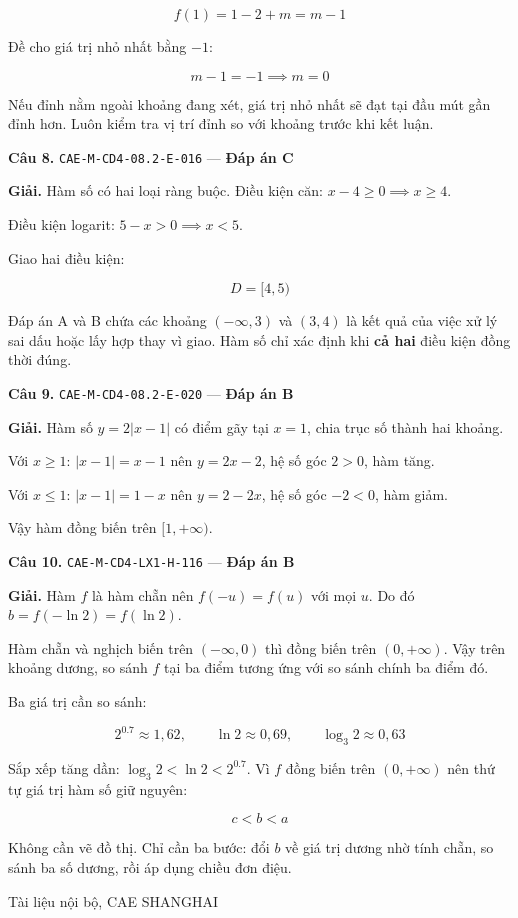 \documentclass[11pt, a4paper]{article}
\begin{document}
$$f(1) = 1 - 2 + m = m - 1$$

Đề cho giá trị nhỏ nhất bằng $-1$:

$$m - 1 = -1 \implies m = 0$$

 Nếu đỉnh nằm ngoài khoảng đang xét, giá trị nhỏ nhất sẽ đạt tại đầu mút gần đỉnh hơn. Luôn kiểm tra vị trí đỉnh so với khoảng trước khi kết luận.

\textbf{Câu 8.} \texttt{CAE-M-CD4-08.2-E-016} — \textbf{Đáp án C}

\textbf{Giải.} Hàm số có hai loại ràng buộc. Điều kiện căn: $x - 4 \ge 0 \implies x \ge 4$.

Điều kiện logarit: $5 - x > 0 \implies x < 5$.

Giao hai điều kiện:

$$D = [4, 5)$$

 Đáp án A và B chứa các khoảng $(-\infty, 3)$ và $(3, 4)$ là kết quả của việc xử lý sai dấu hoặc lấy hợp thay vì giao. Hàm số chỉ xác định khi \textbf{cả hai} điều kiện đồng thời đúng.

\textbf{Câu 9.} \texttt{CAE-M-CD4-08.2-E-020} — \textbf{Đáp án B}

\textbf{Giải.} Hàm số $y = 2|x - 1|$ có điểm gãy tại $x = 1$, chia trục số thành hai khoảng.

Với $x \ge 1$: $|x - 1| = x - 1$ nên $y = 2x - 2$, hệ số góc $2 > 0$, hàm tăng.

Với $x \le 1$: $|x - 1| = 1 - x$ nên $y = 2 - 2x$, hệ số góc $-2 < 0$, hàm giảm.

Vậy hàm đồng biến trên $[1, +\infty)$.

\textbf{Câu 10.} \texttt{CAE-M-CD4-LX1-H-116} — \textbf{Đáp án B}

\textbf{Giải.} Hàm $f$ là hàm chẵn nên $f(-u) = f(u)$ với mọi $u$. Do đó $b = f(-\ln 2) = f(\ln 2)$.

Hàm chẵn và nghịch biến trên $(-\infty, 0)$ thì đồng biến trên $(0, +\infty)$. Vậy trên khoảng dương, so sánh $f$ tại ba điểm tương ứng với so sánh chính ba điểm đó.

Ba giá trị cần so sánh:

$$2^{0.7} \approx 1{,}62, \qquad \ln 2 \approx 0{,}69, \qquad \log_3 2 \approx 0{,}63$$

Sắp xếp tăng dần: $\log_3 2 < \ln 2 < 2^{0.7}$. Vì $f$ đồng biến trên $(0, +\infty)$ nên thứ tự giá trị hàm số giữ nguyên:

$$c < b < a$$

 Không cần vẽ đồ thị. Chỉ cần ba bước: đổi $b$ về giá trị dương nhờ tính chẵn, so sánh ba số dương, rồi áp dụng chiều đơn điệu.
\vspace{0.8cm}
\begin{center}
{\footnotesize\color{cae_blue} Tài liệu nội bộ, CAE SHANGHAI}
\end{center}
\end{document}
